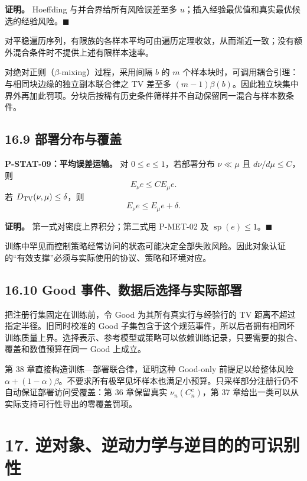 \documentclass[
  11pt,
  oneside]{book}
\begin{document}
\textbf{证明。} Hoeffding 与并合界给所有风险误差至多 \(u\)；插入经验最优值和真实最优候选的经验风险。\(\blacksquare\)

对平稳遍历序列，有限族的各样本平均可由遍历定理收敛，从而渐近一致；没有额外混合条件时不提供上述有限样本速率。

对绝对正则（\(\beta\)-mixing）过程，采用间隔 \(b\) 的 \(m\) 个样本块时，可调用耦合引理：与相同块边缘的独立副本联合律之 TV 差至多 \((m-1)\beta(b)\)。因此独立块集中界外再加此罚项。分块后按稀有历史条件筛样并不自动保留同一混合与样本数条件。

\section{16.9 部署分布与覆盖}\label{ux90e8ux7f72ux5206ux5e03ux4e0eux8986ux76d6}

\hypertarget{p-stat-09}{}\label{p-stat-09}

\textbf{P-STAT-09：平均误差运输。} 对 \(0\le e\le1\)，若部署分布 \(\nu\ll\mu\) 且 \(d\nu/d\mu\le C\)，则 \[E_\nu e\le C E_\mu e.\] 若 \(D_{\rm TV}(\nu,\mu)\le\delta\)，则 \[E_\nu e\le E_\mu e+\delta.\]

\textbf{证明。} 第一式对密度上界积分；第二式用 P-MET-02 及 \(\operatorname{sp}(e)\le1\)。\(\blacksquare\)

训练中罕见而控制策略经常访问的状态可能决定全部失败风险。因此对象认证的``有效支撑''必须与实际使用的协议、策略和环境对应。

\section{16.10 Good 事件、数据后选择与实际部署}\label{good-ux4e8bux4ef6ux6570ux636eux540eux9009ux62e9ux4e0eux5b9eux9645ux90e8ux7f72}

把注册行集固定在训练前，令 Good 为其所有真实行与经验行的 TV 距离不超过指定半径。旧同时校准的 Good 子集包含于这个规范事件，所以后者拥有相同坏训练质量上界。选择表示、参考模型或策略可以依赖训练记录，只要需要的拟合、覆盖和数值预算在同一 Good 上成立。

第 38 章直接构造训练---部署联合律，证明这种 Good-only 前提足以给整体风险 \(\alpha+(1-\alpha)\beta\)。不要求所有极罕见坏样本也满足小预算。只采样部分注册行仍不自动保证部署访问受覆盖：第 36 章保留真实 \(\nu_n(C_n^c)\)，第 37 章给出一类可以从实际支持可行性导出的零覆盖罚项。

\chapter{17. 逆对象、逆动力学与逆目的的可识别性}\label{ch-17}
\end{document}
